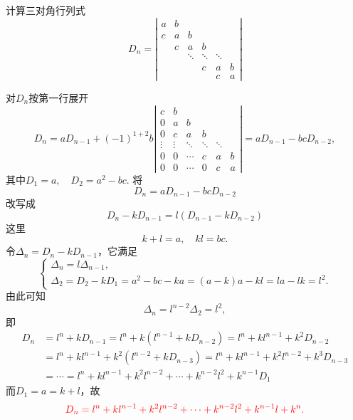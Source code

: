 \documentclass[10pt,a4paper%
tablecaptionabove]{article}
\newcommand{\red}{\textcolor{red}}
\newcommand{\cd}{\cdots}
\newcommand{\dd}{\ddots}
\newcommand{\vd}{\vdots}
\begin{document}
\begin{CJK}{UTF8}{gkai}
\begin{li}
  计算三对角行列式
  $$
  D_n = \left|
    \begin{array}{cccccc}
      a & b & &&&\\
      c&a&b&&&\\
        &c&a&b&&\\
        &&\dd&\dd&\dd&\\
        &&&c&a&b\\
        &&&&c&a
    \end{array}
  \right|
  $$
\end{li}
\begin{jie}
  对$D_n$按第一行展开
  $$
  D_n =  aD_{n-1} + (-1)^{1+2} b \left|
    \begin{array}{cccccc}
      c&b&&&&\\
      0&a&b&&&\\
      0&c&a&b&&\\
      \vd&\vd&\dd&\dd&\dd&\\
      0&0&\cd&c&a&b\\
      0&0&\cd&0&c&a
    \end{array}
  \right|  = a D_{n-1} - bc D_{n-2},
  $$
  其中$D_1=a, \quad D_2=a^2-bc$.
  将　
  $$D_n = a D_{n-1} - bc D_{n-2}$$
  改写成 
  $$
  D_n - k D_{n-1} = l(D_{n-1} - k D_{n-2})
  $$ 
  这里
  $$
  k+l=a, \quad kl = bc.
  $$    
  令$\Delta_n = D_n-kD_{n-1}$，它满足
  $$
  \left\{
    \begin{array}{l}
      \Delta_n = l\Delta_{n-1},  \\[0.05in] 
      \Delta_2 = D_2-kD_1 = a^2-bc - ka = (a-k)a-kl=la-lk=l^2.
    \end{array}    
  \right.
  $$ 
  由此可知
  $$
  \Delta_n = l^{n-2} \Delta_2 = l^2, 
  $$
  即
  $$
  \begin{array}{rl}
    D_n &  = l^n  + k D_{n-1}  = l^n  + k (l^{n-1}  + k D_{n-2}) 
          = l^n  + k l^{n-1}  + k^2 D_{n-2} \\[0.1in]
        & =  l^n  + k l^{n-1}  + k^2 (l^{n-2}  + k D_{n-3} )
          = l^n  + k l^{n-1}  + k^2 l^{n-2}  + k^3 D_{n-3} \\[0.1in]
        & = \cd  =  l^n  + k l^{n-1}  + k^2 l^{n-2}  + \cd + k^{n-2}l^2 + k^{n-1} D_1
  \end{array}
  $$ 
  而$D_1 = a = k+l$，故
  $$
  \red{
    D_n = l^n  + k l^{n-1}  + k^2 l^{n-2}  + \cd + k^{n-2}l^2 + k^{n-1}l + k^n.
  }
  $$

\end{jie}



\end{CJK}
\end{document}
